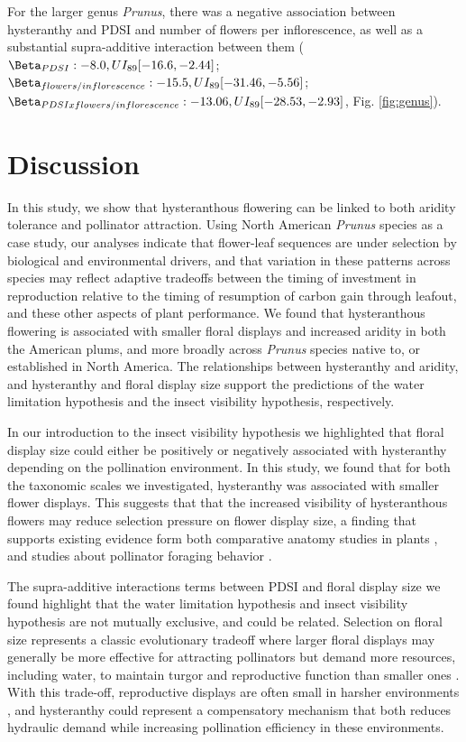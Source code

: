 \documentclass{article}[12pt]
\begin{document}
For the larger genus \emph{Prunus}, there was a negative association between hysteranthy and PDSI and number of flowers per inflorescence, as well as a substantial supra-additive interaction between them ($\Beta_{PDSI}:-8.0, UI_{89}[-16.6,-2.44]$; $\Beta_{flowers/inflorescence}: -15.5, UI_{89}[-31.46,-5.56]$; $\Beta_{PDSI x flowers/inflorescence }: -13.06, UI_{89}[-28.53,-2.93]$, Fig. \ref{fig:genus}). 

\section*{Discussion}
In this study, we show that hysteranthous flowering can be linked to both aridity tolerance and pollinator attraction. Using North American \textit{Prunus} species as a case study, our analyses indicate that flower-leaf sequences are under selection by biological and environmental drivers, and that variation in these patterns across species may reflect adaptive tradeoffs between the timing of investment in reproduction relative to the timing of resumption of carbon gain through leafout, and these other aspects of plant performance. We found that hysteranthous flowering is associated with smaller floral displays and increased aridity in both the American plums, and more broadly across \emph{Prunus} species native to, or established in North America. The relationships between hysteranthy and aridity, and hysteranthy and floral display size support the predictions of the water limitation hypothesis and the insect visibility hypothesis, respectively. 

In our introduction to the insect visibility hypothesis we highlighted that floral display size could either be positively or negatively associated with hysteranthy depending on the pollination environment. In this study, we found that for both the taxonomic scales we investigated, hysteranthy was associated with smaller flower displays. This suggests that that the increased visibility of hysteranthous flowers may reduce selection pressure on flower display size, a finding that supports existing evidence form both comparative anatomy studies in plants \citep{Gunatilleke1984}, and studies about pollinator foraging behavior \citep{Forrest:2009aa,Rivest:2017aa}.

The supra-additive interactions terms between PDSI and floral display size we found highlight that the water limitation hypothesis and insect visibility hypothesis are not mutually exclusive, and could be related. Selection on floral size represents a classic evolutionary tradeoff where larger floral displays may generally be more effective for attracting pollinators but demand more resources, including water, to maintain turgor and reproductive function than smaller ones \citep{Galen:1999vr,Lambrecht:2007ur}. With this trade-off, reproductive displays are often small in harsher environments \citep{Teixido:2016aa,Lambrecht:2013aa}, and hysteranthy could represent a compensatory mechanism that both reduces hydraulic demand while increasing pollination efficiency in these environments.
\end{document}
